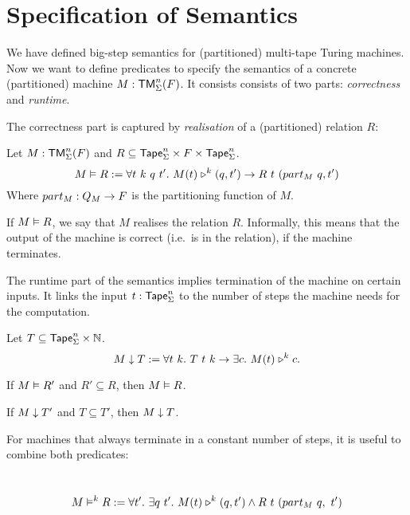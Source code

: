 \section{Specification of Semantics}
\label{sec:spec_semantics}

We have defined big-step semantics for (partitioned) multi-tape Turing machines.  Now we want to define predicates to specify the semantics of a
concrete (partitioned) machine $M: \mathsf{TM}_\Sigma^n(F)$.  It consists consists of two parts: \emph{correctness} and \emph{runtime}.

The correctness part is captured by \emph{realisation} of a (partitioned) relation $R$:

\begin{definition}[Realisation]
  \label{def:realisation}
  Let $M:\mathsf{TM}_\Sigma^n(F)$ and $R \subseteq \mathsf{Tape}_\Sigma^n \times F \times \mathsf{Tape}_\Sigma^n$.
  \[
    M \mathrel{\vDash} R :=
    \forall t~k~q~t'.~M(t) \mathrel{\triangleright}^k (q, t') \rightarrow
    R~t~(part_M~q, t')
  \]
  Where $part_M : Q_M \rightarrow F$ is the partitioning function of $M$.
\end{definition}

If $M \mathrel{\vDash} R$, we say that $M$ realises the relation $R$.  Informally, this means that the output of the machine is correct (i.e.\ is in the
relation), if the machine terminates.

The runtime part of the semantics implies termination of the machine on certain inputs.  It links the input $t:\mathsf{Tape}_\Sigma^n$ to the number of steps
the machine needs for the computation.

\begin{definition}
  \label{def:TerminatesIn}
  Let $T \subseteq \mathsf{Tape}_\Sigma^n \times \mathbb{N}$.
  \[
    M \mathrel{\downarrow} T :=
    \forall t~k.~T~t~k \rightarrow
    \exists c.~M (t) \mathrel{\triangleright}^k c.
  \]
\end{definition}


\begin{lemma}
  \label{lem:Realise_monotone}
  If $M \mathrel{\vDash} R'$ and $R' \subseteq R$, then $M \mathrel{\vDash} R$.
\end{lemma}

\begin{lemma}
  \label{lem:TerminatesIn_monotone}
  If $M \mathrel{\downarrow} T'$ and $T \subseteq T'$, then $M \mathrel{\downarrow} T$.
\end{lemma}

For machines that always terminate in a constant number of steps, it is useful to combine both predicates:
\begin{definition}
  \label{def:RealiseIn}
  ~
  \[
    M \mathrel{\vDash^{k}} R :=
    \forall t'.~
    \exists q~t'.~
    M(t) \mathrel{\triangleright}^k(q, t') \land R~t~(part_M~q,~t')
  \]
\end{definition}

